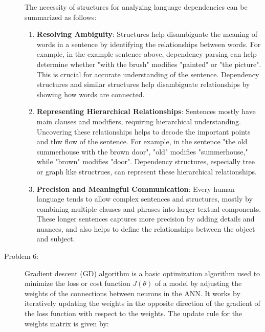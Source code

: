 \documentclass[12pt]{article}
\begin{document}
\begin{description}
  The necessity of structures for analyzing language dependencies can be summarized as follows:

  \begin{enumerate}
    \item \textbf{Resolving Ambiguity}: Structures help disambiguate the meaning of words in a sentence by identifying the relationships between words. For example, in the example
    sentence above, dependency parsing can help determine whether "with the brush" modifies "painted" or "the picture". This is crucial for accurate understanding of the sentence.
    Dependency structures and similar structures help disambiguate relationships by showing how words are connected.

    \item \textbf{Representing Hierarchical Relationships}: Sentences mostly have main clauses and modifiers, requiring hierarchical understanding. Uncovering these relationships
    helps to decode the important points and thw flow of the sentence. For example, in the sentence "the old summerhouse with the brown door", "old" modifies "summerhouse," while "brown" 
    modifies "door". Dependency structures, especially tree or graph like structrues, can represent these hierarchical relationships.

    \item \textbf{Precision and Meaningful Communication}: Every human language tends to allow complex sentences and structures, mostly by combining multiple clauses and phrases
    into larger textual components. These longer sentences captures more precision by adding details and nuances, and also helps to define the relationships between the object and subject.
    
  \end{enumerate}

  \pagebreak

  \item[Problem 6:] \hfill %
  
  Gradient descent (GD) algorithm is a basic optimization algorithm used to minimize the loss or cost function $J(\theta)$ of a model by adjusting the weights of the connections between neurons in the ANN.
  It works by iteratively updating the weights in the opposite direction of the gradient of the loss function with respect to the weights. The update rule for the weights matrix is given by:


\end{description}
\end{document}
